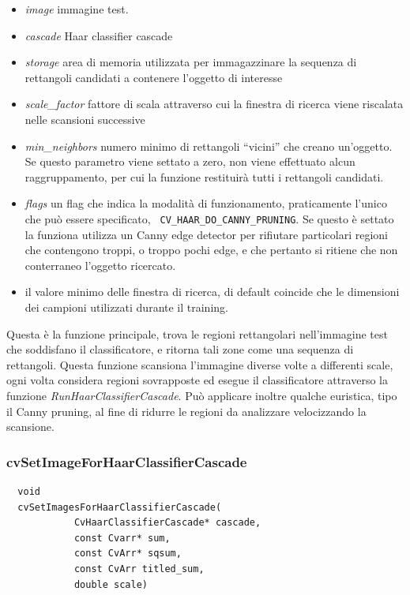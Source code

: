 \documentclass[a4paper,11pt]{article}
\begin{document}
\begin{itemize}
\item \emph{image } immagine test.
\item \emph{cascade} Haar classifier cascade
\item \emph{storage} area di memoria utilizzata per immagazzinare la
  sequenza di rettangoli candidati a contenere l'oggetto di interesse
\item \emph{scale\_factor} fattore di scala attraverso cui la finestra
  di ricerca viene riscalata nelle scansioni successive
\item \emph{min\_neighbors} numero minimo di rettangoli ``vicini'' che
  creano un'oggetto. Se questo parametro viene settato a zero, non
  viene effettuato alcun raggruppamento, per cui la funzione
  restituirà tutti i rettangoli candidati.
\item \emph{flags} un flag che indica la modalità di funzionamento,
  praticamente l'unico che può essere specificato, \texttt{\small
    CV\_HAAR\_DO\_CANNY\_PRUNING}. Se questo è settato la funziona
  utilizza un Canny edge detector per rifiutare particolari regioni
  che contengono troppi, o troppo pochi edge, e che pertanto si
  ritiene che non conterraneo l'oggetto ricercato.
\item il valore minimo delle finestra di ricerca, di default
  coincide che le dimensioni dei campioni utilizzati durante il
  training.
\end{itemize}

Questa è la funzione principale, trova le regioni rettangolari
nell'immagine test che soddisfano il classificatore, e ritorna tali
zone come una sequenza di rettangoli. Questa funzione scansiona
l'immagine diverse volte a differenti scale, ogni volta considera
regioni sovrapposte ed esegue il classificatore attraverso la funzione
\emph{RunHaarClassifierCascade}. Può applicare inoltre qualche
euristica, tipo il Canny pruning, al fine di ridurre le regioni da
analizzare velocizzando la scansione.


\subsubsection{cvSetImageForHaarClassifierCascade}
\label{sec:setimage}

\begin{lstlisting}
  void  
  cvSetImagesForHaarClassifierCascade(
            CvHaarClassifierCascade* cascade, 
            const Cvarr* sum, 
            const CvArr* sqsum, 
            const CvArr titled_sum, 
            double scale)
\end{lstlisting}
\end{document}
